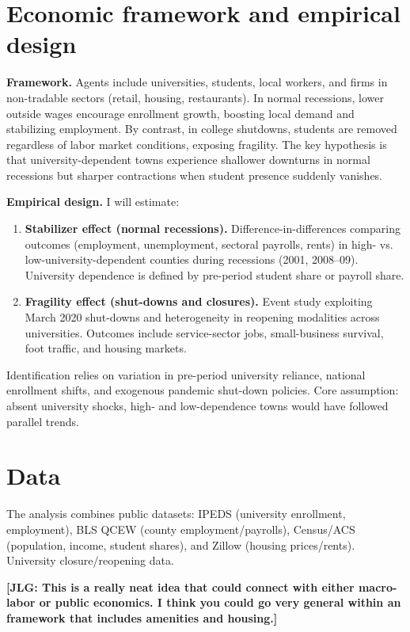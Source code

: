 \section{ Economic framework and empirical design}

\noindent \textbf{Framework.} Agents include universities, students, local workers, and firms in non-tradable sectors (retail, housing, restaurants). In normal recessions, lower outside wages encourage enrollment growth, boosting local demand and stabilizing employment. By contrast, in college shutdowns, students are removed regardless of labor market conditions, exposing fragility. The key hypothesis is that university-dependent towns experience shallower downturns in normal recessions but sharper contractions when student presence suddenly vanishes.

\noindent \textbf{Empirical design.} I will estimate:
\begin{enumerate}
	\item \textbf{Stabilizer effect (normal recessions).} Difference-in-differences comparing outcomes (employment, unemployment, sectoral payrolls, rents) in high- vs. low-university-dependent counties during recessions (2001, 2008–09). University dependence is defined by pre-period student share or payroll share.
	\item \textbf{Fragility effect (shut-downs and closures).} Event study exploiting March 2020 shut-downs and heterogeneity in reopening modalities across universities. Outcomes include service-sector jobs, small-business survival, foot traffic, and housing markets.
\end{enumerate}
Identification relies on variation in pre-period university reliance, national enrollment shifts, and exogenous pandemic shut-down policies. Core assumption: absent university shocks, high- and low-dependence towns would have followed parallel trends.

\section{ Data}
\noindent The analysis combines public datasets: IPEDS (university enrollment, employment), BLS QCEW (county employment/payrolls), Census/ACS (population, income, student shares), and Zillow (housing prices/rents). University closure/reopening data.




\bigskip

\noindent \textbf{[JLG: This is a really neat idea that could connect with either macro-labor or public economics. I think you could go very general within an framework that includes amenities and housing.]} 


